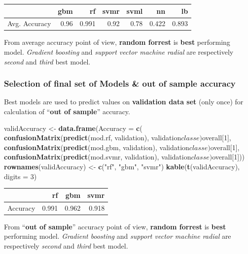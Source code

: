 \documentclass[]{article}
\newenvironment{Shaded}{\begin{snugshade}}{\end{snugshade}}
\newcommand{\KeywordTok}[1]{\textcolor[rgb]{0.13,0.29,0.53}{\textbf{{#1}}}}
\newcommand{\DataTypeTok}[1]{\textcolor[rgb]{0.13,0.29,0.53}{{#1}}}
\newcommand{\DecValTok}[1]{\textcolor[rgb]{0.00,0.00,0.81}{{#1}}}
\newcommand{\StringTok}[1]{\textcolor[rgb]{0.31,0.60,0.02}{{#1}}}
\newcommand{\NormalTok}[1]{{#1}}
\begin{document}
\begin{longtable}[]{@{}lrrrrrr@{}}
\toprule
& gbm & rf & svmr & svml & nn & lb\tabularnewline
\midrule
\endhead
Avg. Accuracy & 0.96 & 0.991 & 0.92 & 0.78 & 0.422 &
0.893\tabularnewline
\bottomrule
\end{longtable}

From average accuracy point of view, \textbf{random forrest} is
\textbf{best} performing model. \emph{Gradient boosting} and
\emph{support vector machine radial} are respectively \emph{second} and
\emph{third} best model.

\subsubsection{Selection of final set of Models \& out of sample
accuracy}\label{selection-of-final-set-of-models-out-of-sample-accuracy}

Best models are used to predict values on \textbf{validation data set}
(only once) for calculation of ``\textbf{out of sample}'' accuracy.

\begin{Shaded}
\begin{Highlighting}[]
\NormalTok{validAccuracy <-}\StringTok{ }\KeywordTok{data.frame}\NormalTok{(}\DataTypeTok{Accuracy =} \KeywordTok{c}\NormalTok{(}
\KeywordTok{confusionMatrix}\NormalTok{(}\KeywordTok{predict}\NormalTok{(mod.rf, validation), validation$classe)$overall[}\DecValTok{1}\NormalTok{],}
\KeywordTok{confusionMatrix}\NormalTok{(}\KeywordTok{predict}\NormalTok{(mod.gbm, validation), validation$classe)$overall[}\DecValTok{1}\NormalTok{],}
\KeywordTok{confusionMatrix}\NormalTok{(}\KeywordTok{predict}\NormalTok{(mod.svmr, validation), validation$classe)$overall[}\DecValTok{1}\NormalTok{]))}
\KeywordTok{rownames}\NormalTok{(validAccuracy) <-}\StringTok{ }\KeywordTok{c}\NormalTok{(}\StringTok{"rf"}\NormalTok{, }\StringTok{"gbm"}\NormalTok{, }\StringTok{"svmr"}\NormalTok{)}
\KeywordTok{kable}\NormalTok{(}\KeywordTok{t}\NormalTok{(validAccuracy), }\DataTypeTok{digits =} \DecValTok{3}\NormalTok{)}
\end{Highlighting}
\end{Shaded}

\begin{longtable}[]{@{}lrrr@{}}
\toprule
& rf & gbm & svmr\tabularnewline
\midrule
\endhead
Accuracy & 0.991 & 0.962 & 0.918\tabularnewline
\bottomrule
\end{longtable}

From ``\textbf{out of sample}'' accuracy point of view, \textbf{random
forrest} is \textbf{best} performing model. \emph{Gradient boosting} and
\emph{support vector machine radial} are respectively \emph{second} and
\emph{third} best model.
\end{document}

